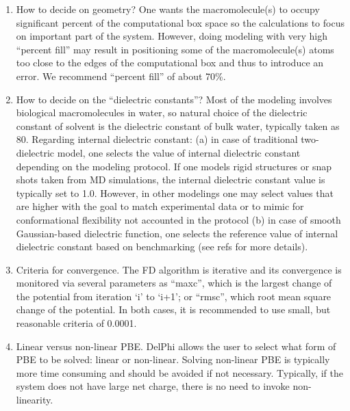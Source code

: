\documentclass[9pt,tutorial]{livecoms}
\begin{document}
\begin{enumerate}
    \item How to decide on geometry? One wants the macromolecule(s) to occupy significant percent of the computational box space so the calculations to focus on important part of the system. However, doing modeling with very high ``percent fill'' may result in positioning some of the macromolecule(s) atoms too close to the edges of the computational box and thus to introduce an error. We recommend ``percent fill'' of about 70\%. 

    \item How to decide on the ``dielectric constants''? Most of the modeling involves biological macromolecules in water, so natural choice of the dielectric constant of solvent is the dielectric constant of bulk water, typically taken as 80. Regarding internal dielectric constant: (a) in case of traditional two-dielectric model, one selects the value of internal dielectric constant depending on the modeling protocol. If one models rigid structures or snap shots taken from MD simulations, the internal dielectric constant value is typically set to 1.0. However, in other modelings one may select values that are higher with the goal to match experimental data or to mimic for conformational flexibility not accounted in the protocol (b) in case of smooth Gaussian-based dielectric function, one selects the reference value of internal dielectric constant based on benchmarking (see refs\cite{li2014modeling,li2013progress,wang2015pka,wang2015delphipka} for more details).  

    \item Criteria for convergence. The FD algorithm is iterative and its convergence is monitored via several parameters as ``maxc'', which is the largest change of the potential from iteration `i' to `i+1'; or ``rmsc'', which root mean square change of the potential. In both cases, it is recommended to use small, but reasonable criteria of 0.0001. 

    \item Linear versus non-linear PBE. DelPhi allows the user to select what form of PBE to be solved: linear or non-linear. Solving non-linear PBE is typically more time consuming and should be avoided if not necessary. Typically, if the system does not have large net charge, there is no need to invoke non-linearity\cite{talley2008electrostatic,chakavorty2016electrostatic}.
\end{enumerate}
\end{document}
